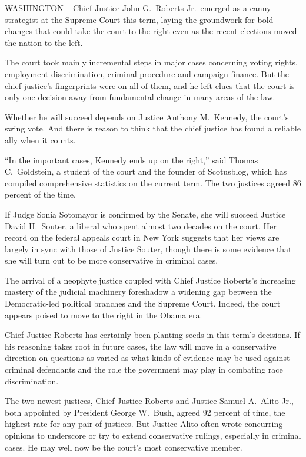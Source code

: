 ﻿\documentclass[12pt]{article}
\begin{document}
WASHINGTON -- Chief Justice John G.~Roberts Jr.~emerged as a canny strategist at the Supreme Court
this term, laying the groundwork for bold changes that could take the court to the right even as the
recent elections moved the nation to the left.

The court took mainly incremental steps in major cases concerning voting rights, employment
discrimination, criminal procedure and campaign finance. But the chief justice's fingerprints were
on all of them, and he left clues that the court is only one decision away from fundamental change
in many areas of the law.

Whether he will succeed depends on Justice Anthony M.~Kennedy, the court's swing vote. And there is
reason to think that the chief justice has found a reliable ally when it counts.

``In the important cases, Kennedy ends up on the right,'' said Thomas C.~Goldstein, a student of the
court and the founder of Scotusblog, which has compiled comprehensive statistics on the current
term. The two justices agreed 86 percent of the time.

If Judge Sonia Sotomayor is confirmed by the Senate, she will succeed Justice David H.~Souter, a
liberal who spent almost two decades on the court. Her record on the federal appeals court in New
York suggests that her views are largely in sync with those of Justice Souter, though there is some
evidence that she will turn out to be more conservative in criminal cases.

The arrival of a neophyte justice coupled with Chief Justice Roberts's increasing mastery of the
judicial machinery foreshadow a widening gap between the Democratic-led political branches and the
Supreme Court. Indeed, the court appears poised to move to the right in the Obama era.

Chief Justice Roberts has certainly been planting seeds in this term's decisions. If his reasoning
takes root in future cases, the law will move in a conservative direction on questions as varied as
what kinds of evidence may be used against criminal defendants and the role the government may play
in combating race discrimination.

The two newest justices, Chief Justice Roberts and Justice Samuel A.~Alito Jr., both appointed by
President George W.~Bush, agreed 92 percent of time, the highest rate for any pair of justices. But
Justice Alito often wrote concurring opinions to underscore or try to extend conservative rulings,
especially in criminal cases. He may well now be the court's most conservative member.
\end{document}

